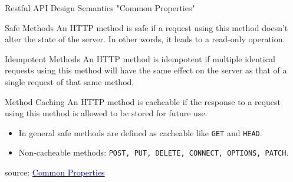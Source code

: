 \documentclass{beamer}
\newcommand{\code}[1]{\colorbox{codegray}{\texttt{#1}}}
\begin{document}
\begin{frame}[t]{Restful API Design Semantics "Common Properties"}
	\scriptsize
	\begin{block}{Safe Methods}		
		An HTTP method is safe if a request using this method doesn’t alter the state of the server. In other words, it leads to a read-only operation.	
	\end{block}
		
	\begin{block}{Idempotent Methods}	
		An HTTP method is idempotent if multiple identical requests using this method will have the same effect on the server as that of a single request of that same method.
	\end{block}
	
	\begin{block}{Method Caching}
		An HTTP method is cacheable if the response to a request using this method is allowed to be stored for future use. 
		\begin{itemize}
			\item In general safe methods are defined as cacheable like \code{GET} and \code{HEAD}.
			\item Non-cacheable methods: \code{POST, PUT, DELETE, CONNECT, OPTIONS, PATCH}.
		\end{itemize}			
		
	\end{block}
	
	\vspace{10mm}
	\tiny source: \href{https://learning.mlytics.com/the-internet/http-request-methods} {\textcolor{blue}{Common Properties}} 
\end{frame}
\end{document}
